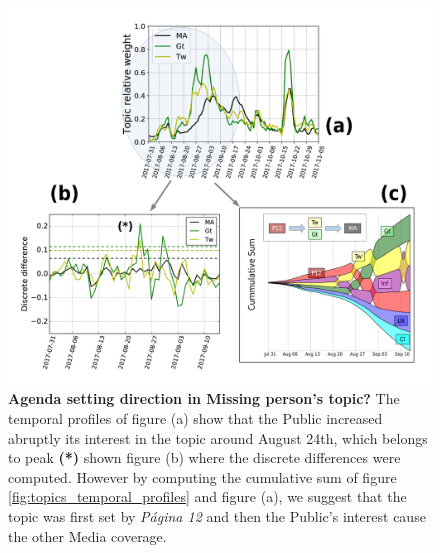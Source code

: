 \begin{figure}
\includegraphics[width = \textwidth]{images/Fig8.pdf}
\caption{\textbf{Agenda setting direction in Missing person's topic?}
The temporal profiles of figure (a) show that the Public increased abruptly its interest in the topic around August 24th, which belongs to peak \textbf{(*)} shown figure (b) where the discrete differences were computed. 
However by computing the cumulative sum of figure \ref{fig:topics_temporal_profiles} and figure (a), we suggest that the topic was first set by \emph{Página 12} and then the Public's interest cause the other Media coverage.
}
\label{fig:Maldonado_setagenda}
\end{figure}




